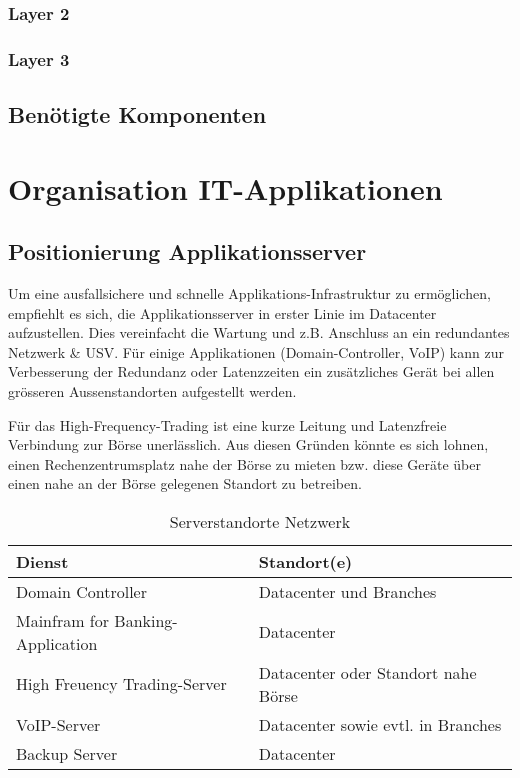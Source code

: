 \subsubsection{Layer 2}
\subsubsection{Layer 3}

\subsection{Benötigte Komponenten}

\section{Organisation IT-Applikationen}

\subsection{Positionierung Applikationsserver}

Um eine ausfallsichere und schnelle Applikations-Infrastruktur zu ermöglichen, empfiehlt es sich, die Applikationsserver in erster Linie im Datacenter aufzustellen. Dies vereinfacht die Wartung und z.B. Anschluss an ein redundantes Netzwerk \& USV. Für einige Applikationen (Domain-Controller, VoIP) kann zur Verbesserung der Redundanz oder Latenzzeiten ein zusätzliches Gerät bei allen grösseren Aussenstandorten aufgestellt werden.

Für das High-Frequency-Trading ist eine kurze Leitung und Latenzfreie Verbindung zur Börse unerlässlich. Aus diesen Gründen könnte es sich lohnen, einen Rechenzentrumsplatz nahe der Börse zu mieten bzw. diese Geräte über einen nahe an der Börse gelegenen Standort zu betreiben.

\begin{table}[h]
	\centering
	\begin{tabu} to \linewidth {l l}
		\toprule 
		Dienst & Standort(e) \\
		\midrule
		Domain Controller & Datacenter und Branches \\
		Mainfram for Banking-Application & Datacenter \\
		High Freuency Trading-Server & Datacenter oder Standort nahe Börse \\
		VoIP-Server & Datacenter sowie evtl. in Branches\\
		Backup Server & Datacenter \\
		\bottomrule 
	\end{tabu} 
	\label{tbl:server_standorte}
	\caption{Serverstandorte Netzwerk}
\end{table}

